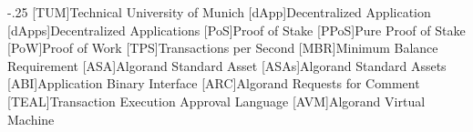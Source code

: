 \documentclass[headsepline,footsepline,footinclude=false,oneside,fontsize=11pt,paper=a4,listof=totoc,bibliography=totoc]{scrbook} %
\begin{document}


\frontmatter{}





\tableofcontents{}

\mainmatter{}








\appendix{}


\begin{acronym}
	\itemsep-.25\baselineskip
	[TUM]{Technical University of Munich}
	[dApp]{Decentralized Application}
	[dApps]{Decentralized Applications}
	[PoS]{Proof of Stake}
	[PPoS]{Pure Proof of Stake}
	[PoW]{Proof of Work}
	[TPS]{Transactions per Second}
	[MBR]{Minimum Balance Requirement}
	[ASA]{Algorand Standard Asset}
	[ASAs]{Algorand Standard Assets}
	[ABI]{Application Binary Interface}
	[ARC]{Algorand Requests for Comment}
	[TEAL]{Transaction Execution Approval Language}
	[AVM]{Algorand Virtual Machine}
\end{acronym}

\listoffigures{}
\listoftables{}
\printbibliography{}
\end{document}
